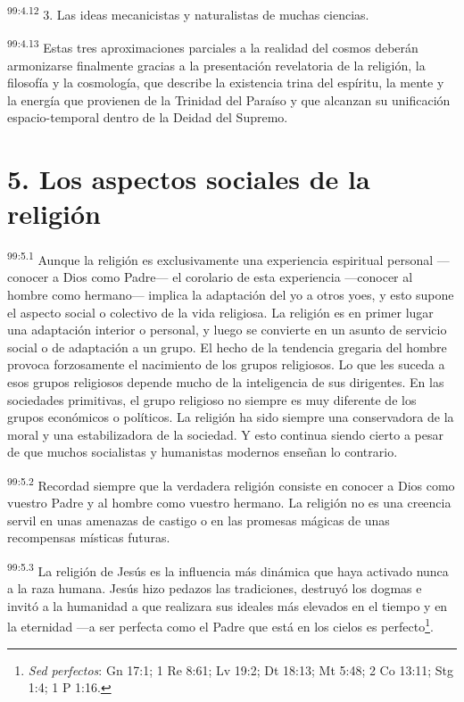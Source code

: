 \par
\textsuperscript{99:4.12} 3. Las ideas mecanicistas y naturalistas de muchas ciencias.

\par
\textsuperscript{99:4.13} Estas tres aproximaciones parciales a la realidad del cosmos deberán armonizarse finalmente gracias a la presentación revelatoria de la religión, la filosofía y la cosmología, que describe la existencia trina del espíritu, la mente y la energía que provienen de la Trinidad del Paraíso y que alcanzan su unificación espacio-temporal dentro de la Deidad del Supremo.

\section*{5. Los aspectos sociales de la religión}
\par
\textsuperscript{99:5.1} Aunque la religión es exclusivamente una experiencia espiritual personal ---conocer a Dios como Padre--- el corolario de esta experiencia ---conocer al hombre como hermano--- implica la adaptación del yo a otros yoes, y esto supone el aspecto social o colectivo de la vida religiosa. La religión es en primer lugar una adaptación interior o personal, y luego se convierte en un asunto de servicio social o de adaptación a un grupo. El hecho de la tendencia gregaria del hombre provoca forzosamente el nacimiento de los grupos religiosos. Lo que les suceda a esos grupos religiosos depende mucho de la inteligencia de sus dirigentes. En las sociedades primitivas, el grupo religioso no siempre es muy diferente de los grupos económicos o políticos. La religión ha sido siempre una conservadora de la moral y una estabilizadora de la sociedad. Y esto continua siendo cierto a pesar de que muchos socialistas y humanistas modernos enseñan lo contrario.

\par
\textsuperscript{99:5.2} Recordad siempre que la verdadera religión consiste en conocer a Dios como vuestro Padre y al hombre como vuestro hermano. La religión no es una creencia servil en unas amenazas de castigo o en las promesas mágicas de unas recompensas místicas futuras.

\par
\textsuperscript{99:5.3} La religión de Jesús es la influencia más dinámica que haya activado nunca a la raza humana. Jesús hizo pedazos las tradiciones, destruyó los dogmas e invitó a la humanidad a que realizara sus ideales más elevados en el tiempo y en la eternidad ---a ser perfecta como el Padre que está en los cielos es perfecto\footnote{\textit{Sed perfectos}: Gn 17:1; 1 Re 8:61; Lv 19:2; Dt 18:13; Mt 5:48; 2 Co 13:11; Stg 1:4; 1 P 1:16.}.

